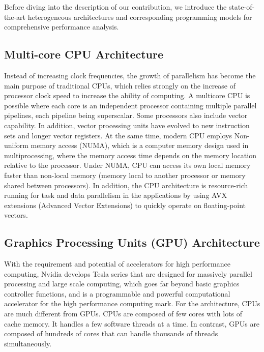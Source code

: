 \vspace{-1mm} 

Before diving into the description of our contribution, we introduce the state-of-the-art heterogeneous architectures and corresponding programming models for comprehensive performance analysis.

\subsection{Multi-core CPU Architecture\\}
\vspace{-4mm} 
  Instead of increasing clock frequencies, the growth of parallelism has become the main purpose of traditional CPUs, which relies strongly on the increase of processor clock speed to increase the ability of computing. A multicore CPU is possible where each core is an independent processor containing multiple parallel pipelines, each pipeline being superscalar. Some processors also include vector capability. In addition, vector processing units have evolved to new instruction sets and longer vector registers. At the same time, modern CPU employs Non-uniform memory access (NUMA), which is a computer memory design used in multiprocessing, where the memory access time depends on the memory location relative to the processor. Under NUMA, CPU can access its own local memory faster than non-local memory (memory local to another processor or memory shared between processors). In addition, the CPU architecture is resource-rich running for task and data parallelism in the applications by using AVX extensions (Advanced Vector Extensions) to quickly operate on floating-point vectors.
  
\subsection{Graphics Processing Units (GPU) Architecture\\}
\vspace{-4mm} 
With the requirement and potential of accelerators for high performance computing, Nvidia develops Tesla series that are designed for massively parallel processing and large scale computing, which goes far beyond basic graphics controller functions, and is a programmable and powerful computational accelerator for the high performance computing mark. For the architecture, CPUs are much different from GPUs. CPUs are composed of few cores with lots of cache memory. It handles a few software threads at a time. In contrast, GPUs are composed of hundreds of cores that can handle thousands of threads simultaneously.
  
